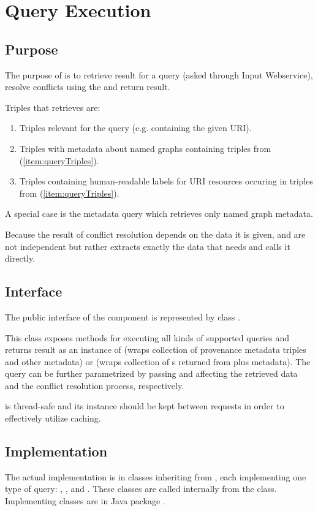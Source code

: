 \chapter{Query Execution}
\label{sec:QE}

\section{Purpose}
The purpose of \QE is to retrieve result for a query (asked through Input Webservice), resolve conflicts using the \CR and return result.

Triples that \QE retrieves are:
\begin{enumerate}
	\item \label{item:queryTriples} Triples relevant for the query (e.g. containing the given URI).
	\item Triples with metadata about named graphs containing triples from (\ref{item:queryTriples}).
	\item Triples containing human-readable labels for URI resources occuring in triples from (\ref{item:queryTriples}).
\end{enumerate}
A special case is the metadata query which retrieves only named graph metadata.

Because the result of conflict resolution depends on the data it is given, \QE and \CR are not independent but rather \QE extracts exactly the data that \CR needs and calls it directly.

\section{Interface}
The public interface of the \QE component is represented by class .

 This class exposes methods for executing all kinds of supported queries and returns result as an instance of  (wraps collection of provenance metadata triples and other metadata) or  (wraps collection of s returned from \CR plus metadata). The query can be further parametrized by passing  and  affecting the retrieved data and the conflict resolution process, respectively.

  is thread-safe and its instance should be kept between requests in order to effectively utilize caching.

\section{Implementation}
The actual implementation is in classes inheriting from , each implementing one type of query: , ,  and . These classes are called internally from the  class. Implementing classes are in Java package .

